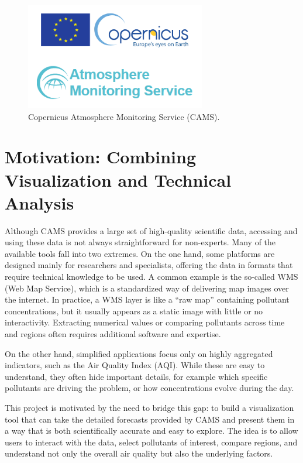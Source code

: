 \begin{figure} [h!btp]
	\centering
	\includegraphics[width=0.7\textwidth]{fig/copernicus-image.png}
	\caption[CAMS]{Copernicus Atmosphere Monitoring Service (CAMS).\footnotemark}
	\label{fig:ej2}
\end{figure}

   

\section{Motivation: Combining Visualization and Technical Analysis}

Although CAMS provides a large set of high-quality scientific data, accessing and using these data is not always straightforward for non-experts. Many of the available tools fall into two extremes. On the one hand, some platforms are designed mainly for researchers and specialists, offering the data in formats that require technical knowledge to be used. A common example is the so-called WMS (Web Map Service), which is a standardized way of delivering map images over the internet. In practice, a WMS layer is like a “raw map” containing pollutant concentrations, but it usually appears as a static image with little or no interactivity. Extracting numerical values or comparing pollutants across time and regions often requires additional software and expertise.

On the other hand, simplified applications focus only on highly aggregated indicators, such as the Air Quality Index (AQI). While these are easy to understand, they often hide important details, for example which specific pollutants are driving the problem, or how concentrations evolve during the day.

This project is motivated by the need to bridge this gap: to build a visualization tool that can take the detailed forecasts provided by CAMS and present them in a way that is both scientifically accurate and easy to explore. The idea is to allow users to interact with the data, select pollutants of interest, compare regions, and understand not only the overall air quality but also the underlying factors.

